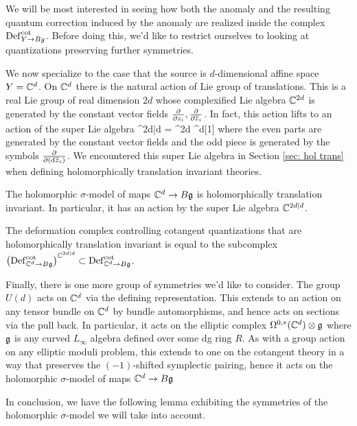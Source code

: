 \documentclass[10pt]{amsart}
\begin{document}
We will be most interested in seeing how both the anomaly and the resulting quantum correction induced by the anomaly are realized inside the complex ${\rm Def}_{Y \to Bg}^{\rm cot}$. 
Before doing this, we'd like to restrict ourselves to looking at quantizations preserving further symmetries. 

We now specialize to the case that the source is $d$-dimensional affine space $Y = \mathbb C^d$.
On $\mathbb C^d$ there is the natural action of Lie group of translations. 
This is a real Lie group of real dimension $2d$ whose complexified Lie algebra $\mathbb C^{2d}$ is generated by the constant vector fields $\frac{\partial}{\partial z_i}, \frac{\partial}{\partial \overline{z}_i}$.
In fact, this action lifts to an action of the super Lie algebra
\ben
\CC^{2d|d} = \CC^{2d} \oplus \CC^d[1]
\een
where the even parts are generated by the constant vector fields and the odd piece is generated by the symbols $\frac{\partial}{\partial ({\rm d} \overline{z}_i)}$. 
We encountered this super Lie algebra in Section \ref{sec: hol trans} when defining holomorphically translation invariant theories.

\begin{lem}
The holomorphic $\sigma$-model of maps $\mathbb C^d \to B \mathfrak g$ is holomorphically translation invariant. 
In particular, it has an action by the super Lie algebra $\mathbb C^{2d|d}$. 
\end{lem}

The deformation complex controlling cotangent quantizations that are holomorphically translation invariant is equal to the subcomplex $\left({\rm Def}_{\mathbb C^d \to B \mathfrak g}^{\rm cot}\right)^{\mathbb C^{2d|d}} \subset {\rm Def}^{\rm cot}_{\mathbb C^d \to B \mathfrak g}$. 

Finally, there is one more group of symmetries we'd like to consider.
The group $U(d)$ acts on $\mathbb C^d$ via the defining representation.
This extends to an action on any tensor bundle on $\mathbb C^d$ by bundle automorphisms, and hence acts on sections via the pull back. 
In particular, it acts on the elliptic complex $\Omega^{0,*}(\mathbb C^d) \otimes \mathfrak g$ where $\mathfrak g$ is any curved $L_\infty$ algebra defined over some dg ring $R$. 
As with a group action on any elliptic moduli problem, this extends to one on the cotangent theory in a way that preserves the $(-1)$-shifted symplectic pairing, hence it acts on the holomorphic $\sigma$-model of maps $\mathbb C^d \to B \mathfrak g$

In conclusion, we have the following lemma exhibiting the symmetries of the holomorphic $\sigma$-model we will take into account.
\end{document}
